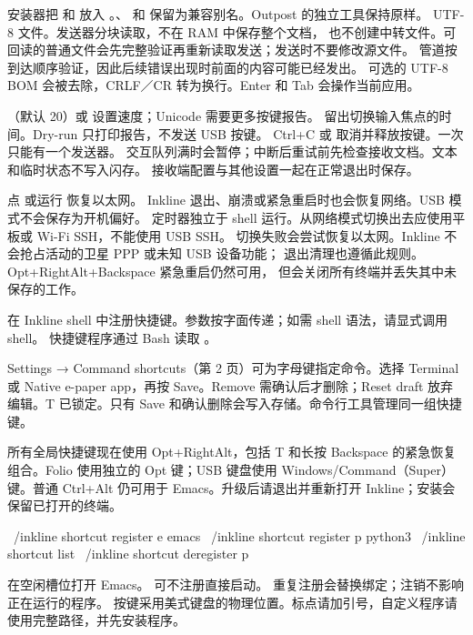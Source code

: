 安装器把  和  放入
。、 和
 保留为兼容别名。Outpost 的独立工具保持原样。
\UsbExamples
UTF-8 文件。发送器分块读取，不在 RAM 中保存整个文档，
也不创建中转文件。可回读的普通文件会先完整验证再重新读取发送；发送时不要修改源文件。
管道按到达顺序验证，因此后续错误出现时前面的内容可能已经发出。
可选的 UTF-8 BOM 会被去除，CRLF／CR 转为换行。Enter 和 Tab 会操作当前应用。

（默认 20）或  设置速度；Unicode 需要更多按键报告。
 留出切换输入焦点的时间。Dry-run 只打印报告，不发送 USB 按键。
Ctrl+C 或  取消并释放按键。一次只能有一个发送器。
交互队列满时会暂停；中断后重试前先检查接收文档。文本和临时状态不写入闪存。
接收端配置与其他设置一起在正常退出时保存。

点 或运行  恢复以太网。
Inkline 退出、崩溃或紧急重启时也会恢复网络。USB 模式不会保存为开机偏好。
\UsbRecoveryExample
定时器独立于 shell 运行。从网络模式切换出去应使用平板或 Wi-Fi SSH，不能使用 USB SSH。
切换失败会尝试恢复以太网。Inkline 不会抢占活动的卫星 PPP 或未知 USB 设备功能；
退出清理也遵循此规则。Opt+RightAlt+Backspace 紧急重启仍然可用，
但会关闭所有终端并丢失其中未保存的工作。

在 Inkline shell 中注册快捷键。参数按字面传递；如需 shell 语法，请显式调用 shell。
快捷键程序通过 Bash 读取 。

Settings → Command shortcuts（第 2 页）可为字母键指定命令。选择 Terminal 或 Native e-paper app，再按 Save。Remove 需确认后才删除；Reset draft 放弃编辑。T 已锁定。只有 Save 和确认删除会写入存储。命令行工具管理同一组快捷键。

所有全局快捷键现在使用 Opt+RightAlt，包括 T 和长按 Backspace 的紧急恢复组合。Folio 使用独立的 Opt 键；USB 键盘使用 Windows/Command（Super）键。普通 Ctrl+Alt 仍可用于 Emacs。升级后请退出并重新打开 Inkline；安装会保留已打开的终端。

\begin{shell}
~/inkline shortcut register e emacs
~/inkline shortcut register p python3
~/inkline shortcut list
~/inkline shortcut deregister p
\end{shell}

 在空闲槽位打开 Emacs。
 可不注册直接启动。
重复注册会替换绑定；注销不影响正在运行的程序。
按键采用美式键盘的物理位置。标点请加引号，自定义程序请使用完整路径，并先安装程序。

